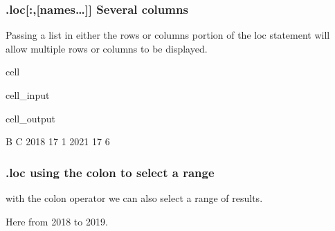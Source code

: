 \documentclass[letterpaper,10pt,english]{jupyterBook}
\begin{document}
\subsubsection{.loc{[}:,{[}names…{]}{]} Several columns}
\label{\detokenize{content/04_PythonEssentials/PythonPackagesEtc:loc-names-several-columns}}
\sphinxAtStartPar
Passing a list in either the rows or columns portion of the loc statement will allow multiple rows or columns to be displayed.

\begin{sphinxuseclass}{cell}\begin{sphinxVerbatimInput}

\begin{sphinxuseclass}{cell_input}
\begin{sphinxVerbatim}[commandchars=\\\{\}]
\PYG{p}{[}\PYG{p}{[}\PYG{p}{]}\PYG{p}{[}\PYG{p}{]}\PYG{p}{]}
\end{sphinxVerbatim}

\end{sphinxuseclass}\end{sphinxVerbatimInput}
\begin{sphinxVerbatimOutput}

\begin{sphinxuseclass}{cell_output}
\begin{sphinxVerbatim}[commandchars=\\\{\}]
       B  C
2018  17  1
2021  17  6
\end{sphinxVerbatim}

\end{sphinxuseclass}\end{sphinxVerbatimOutput}

\end{sphinxuseclass}

\subsubsection{.loc using the colon to select a range}
\label{\detokenize{content/04_PythonEssentials/PythonPackagesEtc:loc-using-the-colon-to-select-a-range}}
\sphinxAtStartPar
with the colon operator we can also select a range of results.

\sphinxAtStartPar
Here from 2018 to 2019.
\end{document}
